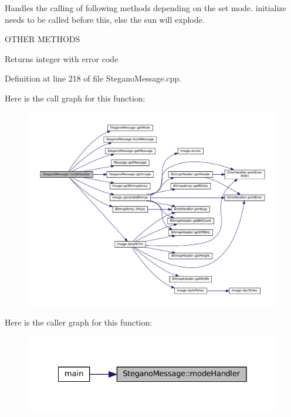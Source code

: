 Handles the calling of following methods depending on the set mode. initialize needs to be called before this, else the sun will explode. 

O\+T\+H\+ER M\+E\+T\+H\+O\+DS\begin{DoxyReturn}{Returns}
integer with error code 
\end{DoxyReturn}


Definition at line 218 of file Stegano\+Message.\+cpp.

Here is the call graph for this function\+:\nopagebreak
\begin{figure}[H]
\begin{center}
\leavevmode
\includegraphics[width=350pt]{classSteganoMessage_a2649e515941e730520b759282d00dcd6_cgraph}
\end{center}
\end{figure}
Here is the caller graph for this function\+:\nopagebreak
\begin{figure}[H]
\begin{center}
\leavevmode
\includegraphics[width=328pt]{classSteganoMessage_a2649e515941e730520b759282d00dcd6_icgraph}
\end{center}
\end{figure}
\mbox{\label{classSteganoMessage_a3ea3f5ff720bf56d33f168d47e2897b0}} 
